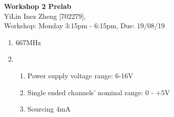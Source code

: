 \documentclass[11pt]{article}
\begin{document}
\begin{center}
\textbf{\Large{Workshop 2 Prelab}}\\
YiLin Inez Zheng [702279], \\
Workshop: Monday 3:15pm - 6:15pm, Due: 19/08/19  
\end{center}

\begin{enumerate}
    \item %
    667MHz
    \item %
    \begin{enumerate}
        \item %
        Power supply voltage range: 6-16V
        \item %
        Single ended channels' nominal range: 0 - $+5$V
        \item %
        Sourcing 4mA
    \end{enumerate}
\end{enumerate}
\end{document}
